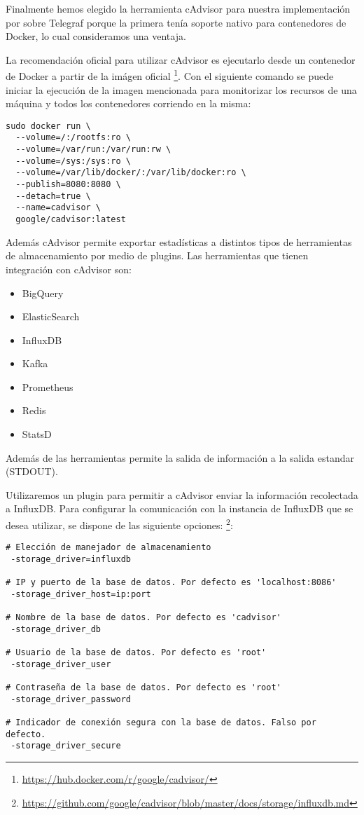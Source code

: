 Finalmente hemos elegido la herramienta cAdvisor para nuestra implementación por sobre Telegraf porque la primera tenía soporte nativo para contenedores de Docker, lo cual consideramos una ventaja.

La recomendación oficial para utilizar cAdvisor es ejecutarlo desde un contenedor de Docker a partir de la imágen oficial \footnote{\url{https://hub.docker.com/r/google/cadvisor/}}. Con el siguiente comando se puede iniciar la ejecución de la imagen mencionada para monitorizar los recursos de una máquina y todos los contenedores corriendo en la misma:

\begin{lstlisting}
sudo docker run \
  --volume=/:/rootfs:ro \
  --volume=/var/run:/var/run:rw \
  --volume=/sys:/sys:ro \
  --volume=/var/lib/docker/:/var/lib/docker:ro \
  --publish=8080:8080 \
  --detach=true \
  --name=cadvisor \
  google/cadvisor:latest
\end{lstlisting}


Además cAdvisor permite exportar estadísticas a distintos tipos de herramientas de almacenamiento por medio de plugins. Las herramientas que tienen integración con cAdvisor son:

\begin{itemize}
  \item BigQuery
  \item ElasticSearch
  \item InfluxDB
  \item Kafka
  \item Prometheus
  \item Redis
  \item StatsD
\end{itemize}

Además de las herramientas permite la salida de información a la salida estandar (STDOUT).

Utilizaremos un plugin para permitir a cAdvisor enviar la información recolectada a InfluxDB. Para configurar la comunicación con la instancia de InfluxDB que se desea utilizar, se dispone de las siguiente opciones: \footnote{\url{https://github.com/google/cadvisor/blob/master/docs/storage/influxdb.md}}:

\begin{lstlisting}
# Elección de manejador de almacenamiento
 -storage_driver=influxdb

# IP y puerto de la base de datos. Por defecto es 'localhost:8086'
 -storage_driver_host=ip:port

# Nombre de la base de datos. Por defecto es 'cadvisor'
 -storage_driver_db

# Usuario de la base de datos. Por defecto es 'root'
 -storage_driver_user

# Contraseña de la base de datos. Por defecto es 'root'
 -storage_driver_password

# Indicador de conexión segura con la base de datos. Falso por defecto.
 -storage_driver_secure
\end{lstlisting}


